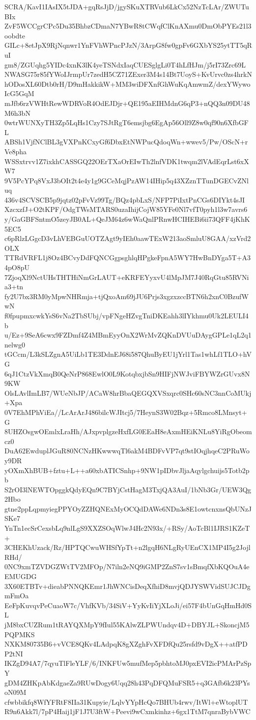 SCRA/KavI1IAsIX5tJDA+gqRsJjD/jgySKuXTRVub6LkCx52NzTcLAr/ZWUTuBIx
ZvF5WCCgrCPc5Du35BhbzCDmaN7YBwR8tCWqfClKnAXmu0DmObPYEs21l3oobdte
GILc+8etJpX9RjNqnwr1YnFVhWPncPJzN/3ArpG8fw0gpFv6GXbYS25ytTT5qRuI
gm8/ZGUqhg5YIDc4xnK3lK4yeTSNdxIaqCUESglgLi0T4hLfHJm/j5rI73Zrc69L
NWASG75r85fYWoIJrmpUr7zedH5CZ71ZExer3M4s14Bt7UoyS+KvUrvc0zs4hrkN
hODosXL60Dtb0rH/D9mHakkikW+MM3wiDFXnfGhWuKqAmwmZ/dexYWywoIcG5GqM
mJfb6rzVWHtRewWDRVoR4OdEJDjr+QE195aEIHMdnG6qP3+nQQ3n09DU48M6h3bN
0wtrWUNXyTH3Zp5LqHs1Czy7SJtRgT6emsjbg6EgAp56Oll9Z8w0qf90n6XfbGFL
ABSh1VjfNClBL3gVXPnKCxyGf6DbxEtNWPucQdoqWn+wwev5/Pw/OScN+rVe8pha
WSSxtrvv1Z7ixkhCASSGQ22OErTXaOrEIwTh2lnfVDK1twqm2lVAdEqrLst6xXW7
9V5PcYPq8VxJ3bOIt2t4e4y1g9GCeMqjPzAW14IHip5q43XZznTTunDGECvZNluq
436v4SCVSCB5p9jqtz02pFvVz99Tg/BQz4pbLxS/NFP7PiIxtPnCGs6DIYkt4sJI
XzcxzfJ+O2tKPF/OdgTWsMTARS0uzaIhijCojW85YFe0Nl7vfT0pyh1l3w7avrs6
y/GaGBFSntmO5zeyJB0AL+QeJM64z6wWaQnlPRnwHCIHEBi6ii73QFF4jKhK5EC5
c6pRlzLGgcD3vLhVEBGuUOTZAgt9yIEh0aawTExW213aoSmluU8GAA/xzVrd2OLX
TTRdVRFL1j8Oz4BCvyDdFQNCGgpsghlqHPgkeFpnA5WY7HwBnDYga5T+A34pO8pU
7ZjoqXl9NctUHsTHTHiNmGrLAUT+eKRFEYyxvU4lMpJM7J40RqGtu85RVNia3+tn
fy2U7bx3RM0yMpwNHRmja+tjQxoAm69jJU6Prjs3xgzxzccBTN6h2xnC0BzufWwN
f0fpupmxcwkYsS6vNa2TbSUbj/vpFNgeHZvgTniDKEahh3lIYkhmu0Uk2LEULI4b
u/Ez+9SeA6cwx9FZDmf4Z4MBmEyyOnX2WrMvZQKnDVUuDAygGPLe1qL2q1nelwg0
tGCcm/L3kSLZgnA5UiLb1TE3DdnEJ68i587QhuByEU1jYrl1Tas1whLf1TLO+hVG
6qJ1CtzVkXmqB0QeNrP868EwlO0L9KotqbxjbSn9HIFjNWJviFBYWZrGUvx8N9KW
OlsLAvlImLB7/WUeNbJP/ACaW8hrBbaQEGQXVSxqrc0SHc60sNC3nnCoMUkj+Xpa
0V7EhMPhViEa//LcArArJ486bilcWJItcj5/7HeynS3W02Bqz+5Rmco8LMnsyt+G
8UHZOsgwOEmlxLraHh/AJxpvplgzeHxfLG0EEaH8eAxmHEiKNLu8YiRgObeomcz0
DuA62EwduplJGuR80NCNzHKwwwqTl6akM4BDFvVP7qt9stIOqjhqeC2PRuWoy9DR
yOXmXhBUB+fztu+L++a60xbATICSnhp+9NW1pIDbvJljaAqylgchuijs5Totb2pb
S2rOI3lNEWTOpggkQdyEQn9C7BYjCstHagM3TxjQA3AuI/1bNb3Gr/UEW3Qg2Hbo
gtne2ppLqpmyiegPPYOyZZHQNExMyOCQdDAWe6NDn3s8E1owtcnxnsQbUNzJSKe7
YnTn1ecSrCexsbLq9nlLgS9XXZSOqWlwJ4Hc2N93x/+RSy/AoTcBl1IJRS1KZeT+
3CHEKhUzack/Rz/HPTQCwuWHSfYpTt+n2lgqH6NLgRyUEnCX1MP4I5g2JojlRHd/
0NC9xmTZVDGZWtTV2MFOp/N7iln2eNQ9iGMP2ZnS7sv1sBmqfXbKQOuA4eEMUGDG
3X60ETBTv+dieabPNNQKEmr1JhWNCisDeqXfhiD8mvjQDJYSWVidSUJCJDgmFmOa
EeFpKuvqvPeCuaoW7c/VhfKVb/34SiV+YyKvIiYjXLoJi/ei57F4bUnGqHmHd0SL
jM8bxCUZRum1tRAYQXMpY9fIul55KAlwZLPWUndqv4D+DBYJL+SkoncjM5PQPMKS
NXKM80735B6+vVCE8QKv4LAdpqK8gXZghFvXFDfQu25rsfd9vDgX++atfPDP2tNI
IKZgD94A7/7qyuTlFleYLF/6/INKFUw5mufMep5pbhtoMJ0pxEVI2icPMArPzSpY
gDM4ZHKpAbKdgaeZa9RUwDogy6Uqq28h43PqDFQMuFSR5+q3GAfb6k23PYsoN09M
cfwbbikfq8WfYFRtF8IIa31Kupyie/LqlvYYpHcQo7BHUb4rwv/ItWl+eWtoplUT
R9n6Akk7l/7pP4Haij1jF1J7U3ftW+Peevi9wCxmkinhz+6gx1TtM7qnraBybVWC

